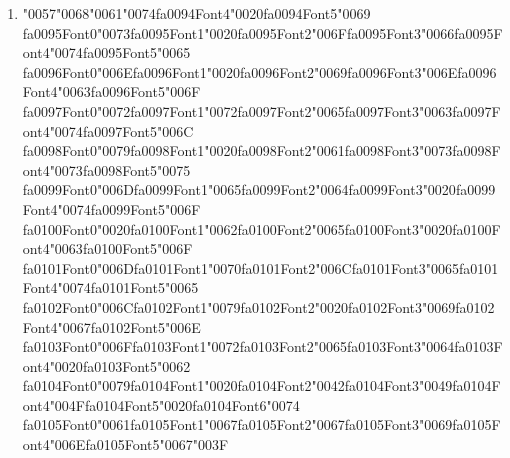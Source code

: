 \documentclass[11pt]{article}
\begin{document}
\begin{enumerate}[label=Q\arabic*., leftmargin=*]
\textbf{A.} Part-of-speech tagging

\textbf{B.} Named Entity Recognition

\textbf{C.} Dependency parsing

\textbf{D.} Sentiment analysis

\item {\char"0057}{\char"0068}{\char"0061}{\char"0074}{\csname fa0094Font4\endcsname\char"0020}{\csname fa0094Font5\endcsname\char"0069} {\csname fa0095Font0\endcsname\char"0073}{\csname fa0095Font1\endcsname\char"0020}{\csname fa0095Font2\endcsname\char"006F}{\csname fa0095Font3\endcsname\char"0066}{\csname fa0095Font4\endcsname\char"0074}{\csname fa0095Font5\endcsname\char"0065} {\csname fa0096Font0\endcsname\char"006E}{\csname fa0096Font1\endcsname\char"0020}{\csname fa0096Font2\endcsname\char"0069}{\csname fa0096Font3\endcsname\char"006E}{\csname fa0096Font4\endcsname\char"0063}{\csname fa0096Font5\endcsname\char"006F} {\csname fa0097Font0\endcsname\char"0072}{\csname fa0097Font1\endcsname\char"0072}{\csname fa0097Font2\endcsname\char"0065}{\csname fa0097Font3\endcsname\char"0063}{\csname fa0097Font4\endcsname\char"0074}{\csname fa0097Font5\endcsname\char"006C} {\csname fa0098Font0\endcsname\char"0079}{\csname fa0098Font1\endcsname\char"0020}{\csname fa0098Font2\endcsname\char"0061}{\csname fa0098Font3\endcsname\char"0073}{\csname fa0098Font4\endcsname\char"0073}{\csname fa0098Font5\endcsname\char"0075} {\csname fa0099Font0\endcsname\char"006D}{\csname fa0099Font1\endcsname\char"0065}{\csname fa0099Font2\endcsname\char"0064}{\csname fa0099Font3\endcsname\char"0020}{\csname fa0099Font4\endcsname\char"0074}{\csname fa0099Font5\endcsname\char"006F} {\csname fa0100Font0\endcsname\char"0020}{\csname fa0100Font1\endcsname\char"0062}{\csname fa0100Font2\endcsname\char"0065}{\csname fa0100Font3\endcsname\char"0020}{\csname fa0100Font4\endcsname\char"0063}{\csname fa0100Font5\endcsname\char"006F} {\csname fa0101Font0\endcsname\char"006D}{\csname fa0101Font1\endcsname\char"0070}{\csname fa0101Font2\endcsname\char"006C}{\csname fa0101Font3\endcsname\char"0065}{\csname fa0101Font4\endcsname\char"0074}{\csname fa0101Font5\endcsname\char"0065} {\csname fa0102Font0\endcsname\char"006C}{\csname fa0102Font1\endcsname\char"0079}{\csname fa0102Font2\endcsname\char"0020}{\csname fa0102Font3\endcsname\char"0069}{\csname fa0102Font4\endcsname\char"0067}{\csname fa0102Font5\endcsname\char"006E} {\csname fa0103Font0\endcsname\char"006F}{\csname fa0103Font1\endcsname\char"0072}{\csname fa0103Font2\endcsname\char"0065}{\csname fa0103Font3\endcsname\char"0064}{\csname fa0103Font4\endcsname\char"0020}{\csname fa0103Font5\endcsname\char"0062} {\csname fa0104Font0\endcsname\char"0079}{\csname fa0104Font1\endcsname\char"0020}{\csname fa0104Font2\endcsname\char"0042}{\csname fa0104Font3\endcsname\char"0049}{\csname fa0104Font4\endcsname\char"004F}{\csname fa0104Font5\endcsname\char"0020}{\csname fa0104Font6\endcsname\char"0074} {\csname fa0105Font0\endcsname\char"0061}{\csname fa0105Font1\endcsname\char"0067}{\csname fa0105Font2\endcsname\char"0067}{\csname fa0105Font3\endcsname\char"0069}{\csname fa0105Font4\endcsname\char"006E}{\csname fa0105Font5\endcsname\char"0067}{\char"003F}


\end{enumerate}
\end{document}
